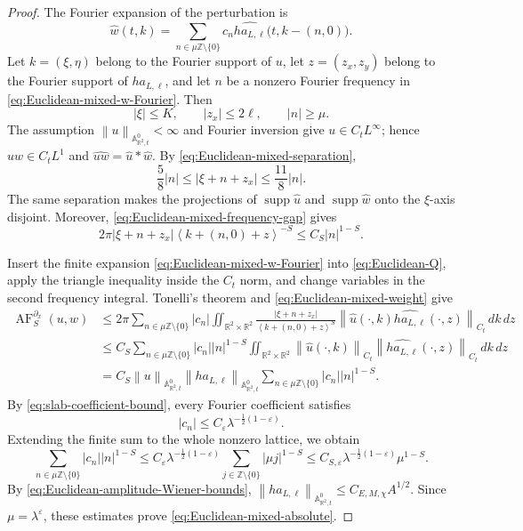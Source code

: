 \documentclass[12pt,reqno,letterpaper]{amsart}
\numberwithin{equation}{section}
\theoremstyle{definition}
\newcommand{\R}{\mathbb R}
\newcommand{\Z}{\mathbb Z}
\newcommand{\A}{\mathbb A}
\newcommand{\eps}{\varepsilon}
\newcommand{\la}{\lambda}
\newcommand{\supp}{\operatorname{supp}}
\newcommand{\norm}[1]{\left\lVert #1\right\rVert}
\newcommand{\abs}[1]{\left\lvert #1\right\rvert}
\begin{document}
\begin{proof}
The Fourier expansion of the perturbation is
\begin{equation}\label{eq:Euclidean-mixed-w-Fourier}
 \widehat w(t,k)
 =\sum_{n\in\mu\Z\setminus\{0\}}c_n
    \widehat{h a_{L,\ell}}\bigl(t,k-(n,0)\bigr).
\end{equation}
Let $k=(\xi,\eta)$ belong to the Fourier support of $u$, let
$z=(z_x,z_y)$ belong to the Fourier support of $h a_{L,\ell}$, and let
$n$ be a nonzero Fourier frequency in
\eqref{eq:Euclidean-mixed-w-Fourier}.  Then
\[
   \abs\xi\leq K,
   \qquad
   \abs{z_x}\leq2\ell,
   \qquad
   \abs n\geq\mu.
\]
The assumption $\norm u_{\A^0_{\R^2,t}}<\infty$ and Fourier inversion give
$u\in C_tL^\infty$; hence $uw\in C_tL^1$ and
$\widehat{uw}=\widehat u*\widehat w$.
By \eqref{eq:Euclidean-mixed-separation},
\begin{equation}\label{eq:Euclidean-mixed-frequency-gap}
 \frac58\abs n\leq\abs{\xi+n+z_x}\leq\frac{11}{8}\abs n.
\end{equation}
The same separation makes the projections of $\supp\widehat u$ and
$\supp\widehat w$ onto the $\xi$-axis disjoint.  Moreover,
\eqref{eq:Euclidean-mixed-frequency-gap} gives
\begin{equation}\label{eq:Euclidean-mixed-weight}
 2\pi\abs{\xi+n+z_x}
   \left\langle k+(n,0)+z\right\rangle^{-S}
 \leq C_S\abs n^{1-S}.
\end{equation}

Insert the finite expansion \eqref{eq:Euclidean-mixed-w-Fourier} into
\eqref{eq:Euclidean-Q}, apply the triangle inequality inside
the $C_t$ norm, and change variables in the second frequency integral.
Tonelli's theorem and \eqref{eq:Euclidean-mixed-weight} give
\begin{align*}
 \operatorname{AF}^{\partial_x}_S(u,w)
 &\leq2\pi\sum_{n\in\mu\Z\setminus\{0\}}\abs{c_n}
   \iint_{\R^2\times\R^2}
   \frac{\abs{\xi+n+z_x}}
        {\left\langle k+(n,0)+z\right\rangle^S}
   \norm{\widehat u(\cdot,k)
     \widehat{h a_{L,\ell}}(\cdot,z)}_{C_t}\,dk\,dz\\
 &\leq C_S\sum_{n\in\mu\Z\setminus\{0\}}
      \abs{c_n}\abs n^{1-S}
   \iint_{\R^2\times\R^2}
     \norm{\widehat u(\cdot,k)}_{C_t}
     \norm{\widehat{h a_{L,\ell}}(\cdot,z)}_{C_t}
       \,dk\,dz\\
 &=C_S\norm{u}_{\A^0_{\R^2,t}}
      \norm{h a_{L,\ell}}_{\A^0_{\R^2,t}}
      \sum_{n\in\mu\Z\setminus\{0\}}
         \abs{c_n}\abs n^{1-S}.
\end{align*}
By \eqref{eq:slab-coefficient-bound}, every Fourier coefficient satisfies
\[
   \abs{c_n}\leq C_\eps\la^{-\frac12(1-\eps)}.
\]
Extending the finite sum to the whole nonzero lattice, we obtain
\[
 \sum_{n\in\mu\Z\setminus\{0\}}\abs{c_n}\abs n^{1-S}
 \leq C_\eps\la^{-\frac12(1-\eps)}
   \sum_{j\in\Z\setminus\{0\}}\abs{\mu j}^{1-S}
 \leq C_{S,\eps}\la^{-\frac12(1-\eps)}\mu^{1-S}.
\]
By \eqref{eq:Euclidean-amplitude-Wiener-bounds},
$\norm{h a_{L,\ell}}_{\A^0_{\R^2,t}}\leq C_{E,M,\chi}A^{1/2}$.
Since $\mu=\la^\eps$, these estimates prove
\eqref{eq:Euclidean-mixed-absolute}.


\end{proof}
\end{document}
